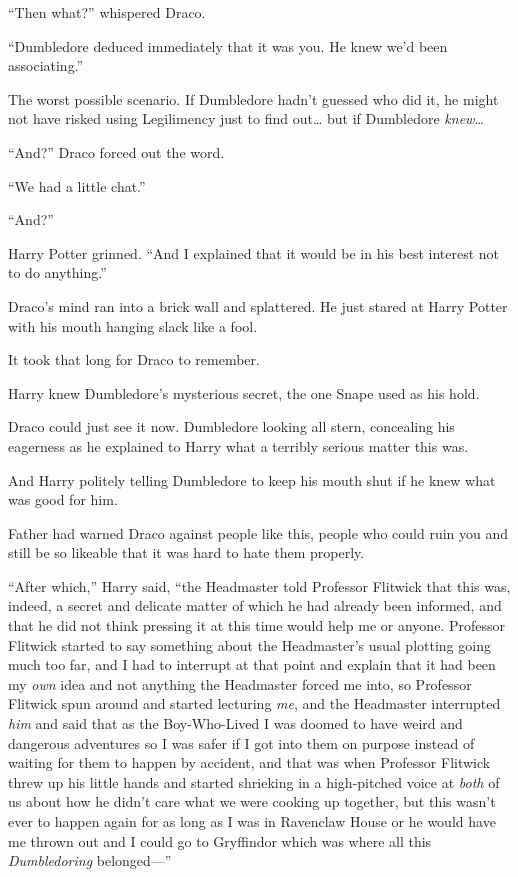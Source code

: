 ``Then what?'' whispered Draco.

``Dumbledore deduced immediately that it was you. He knew we'd been
associating.''

The worst possible scenario. If Dumbledore hadn't guessed who did it, he
might not have risked using Legilimency just to find out\ldots{} but if
Dumbledore \emph{knew\ldots{}}

``And?'' Draco forced out the word.

``We had a little chat.''

``And?''

Harry Potter grinned. ``And I explained that it would be in his best
interest not to do anything.''

Draco's mind ran into a brick wall and splattered. He just stared at
Harry Potter with his mouth hanging slack like a fool.

It took that long for Draco to remember.

Harry knew Dumbledore's mysterious secret, the one Snape used as his
hold.

Draco could just see it now. Dumbledore looking all stern, concealing
his eagerness as he explained to Harry what a terribly serious matter
this was.

And Harry politely telling Dumbledore to keep his mouth shut if he knew
what was good for him.

Father had warned Draco against people like this, people who could ruin
you and still be so likeable that it was hard to hate them properly.

``After which,'' Harry said, ``the Headmaster told Professor Flitwick
that this was, indeed, a secret and delicate matter of which he had
already been informed, and that he did not think pressing it at this
time would help me or anyone. Professor Flitwick started to say
something about the Headmaster's usual plotting going much too far, and
I had to interrupt at that point and explain that it had been my
\emph{own} idea and not anything the Headmaster forced me into, so
Professor Flitwick spun around and started lecturing \emph{me}, and the
Headmaster interrupted \emph{him} and said that as the Boy-Who-Lived I
was doomed to have weird and dangerous adventures so I was safer if I
got into them on purpose instead of waiting for them to happen by
accident, and that was when Professor Flitwick threw up his little hands
and started shrieking in a high-pitched voice at \emph{both} of us about
how he didn't care what we were cooking up together, but this wasn't
ever to happen again for as long as I was in Ravenclaw House or he would
have me thrown out and I could go to Gryffindor which was where all this
\emph{Dumbledoring} belonged---''

